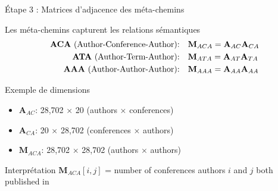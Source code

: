 \documentclass[9pt,aspectratio=169,professionalfonts]{beamer}
\begin{document}
\begin{frame}{Étape 3 : Matrices d'adjacence des méta-chemins}
\begin{block}{Les méta-chemins capturent les relations sémantiques}
\begin{align}
\text{\textbf{ACA} (Author-Conference-Author):} \quad &\mathbf{M}_{ACA} = \mathbf{A}_{AC} \mathbf{A}_{CA} \\
\text{\textbf{ATA} (Author-Term-Author):} \quad &\mathbf{M}_{ATA} = \mathbf{A}_{AT} \mathbf{A}_{TA} \\
\text{\textbf{AAA} (Author-Author-Author):} \quad &\mathbf{M}_{AAA} = \mathbf{A}_{AA} \mathbf{A}_{AA}
\end{align}
\end{block}

\begin{block}{Exemple de dimensions}
\begin{itemize}
    \item $\mathbf{A}_{AC}$: 28,702 $\times$ 20 (authors $\times$ conferences)
    \item $\mathbf{A}_{CA}$: 20 $\times$ 28,702 (conferences $\times$ authors)  
    \item $\mathbf{M}_{ACA}$: 28,702 $\times$ 28,702 (authors $\times$ authors)
\end{itemize}
\end{block}

\begin{block}{Interprétation}
$\mathbf{M}_{ACA}[i,j]$ = number of conferences authors $i$ and $j$ both published in
\end{block}
\end{frame}
\end{document}
